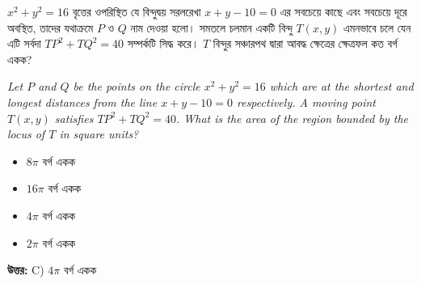 \documentclass[12pt, a4paper]{article}
\begin{document}
\vspace{2em}

\begin{tcolorbox}[questionbox={প্রশ্ন (Question) 46}]
    \noindent
    $x^2 + y^2 = 16$ বৃত্তের ওপরিস্থিত যে বিন্দুদ্বয় সরলরেখা $x + y - 10 = 0$ এর সবচেয়ে কাছে এবং সবচেয়ে দূরে অবস্থিত, তাদের যথাক্রমে $P$ ও $Q$ নাম দেওয়া হলো। সমতলে চলমান একটি বিন্দু $T(x, y)$ এমনভাবে চলে যেন এটি সর্বদা $TP^2 + TQ^2 = 40$ সম্পর্কটি সিদ্ধ করে। $T$ বিন্দুর সঞ্চারপথ দ্বারা আবদ্ধ ক্ষেত্রের ক্ষেত্রফল কত বর্গ একক?
    
    \vspace{0.8em}
    \begin{english}
    \noindent\textit{\color{darkgray}
    Let $P$ and $Q$ be the points on the circle $x^2 + y^2 = 16$ which are at the shortest and longest distances from the line $x + y - 10 = 0$ respectively. A moving point $T(x, y)$ satisfies $TP^2 + TQ^2 = 40$. What is the area of the region bounded by the locus of $T$ in square units?
    }
    \end{english}
\end{tcolorbox}

\begin{itemize}[label={}, leftmargin=1cm, itemsep=0.5em]
    \item[\textbf{A)}] $8\pi$ বর্গ একক
    \item[\textbf{B)}] $16\pi$ বর্গ একক
    \item[\textbf{C)}] $4\pi$ বর্গ একক
    \item[\textbf{D)}] $2\pi$ বর্গ একক
\end{itemize}

\vspace{0.5em}
\begin{tcolorbox}[answerbox]
    \textbf{\color{success} উত্তর:} C) $4\pi$ বর্গ একক
\end{tcolorbox}
\vspace{1em}
\end{document}
